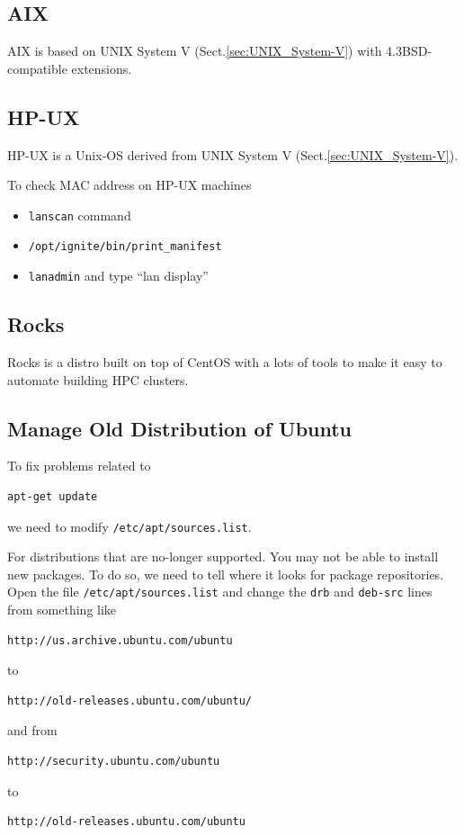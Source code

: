 \subsection{AIX}
\label{sec:AIX}

AIX is based on UNIX System V (Sect.\ref{sec:UNIX_System-V}) with
4.3BSD-compatible extensions.



\subsection{HP-UX}
\label{sec:HP-UX}

HP-UX is a Unix-OS derived from UNIX System V (Sect.\ref{sec:UNIX_System-V}).

To check MAC address on HP-UX machines
\begin{itemize}
  \item \verb!lanscan! command
  \item \verb!/opt/ignite/bin/print_manifest!
  \item \verb!lanadmin! and type ``lan display''
\end{itemize}


\subsection{Rocks}

Rocks is a distro built on top of CentOS with a lots of tools to make it easy to
automate building HPC clusters. 

\subsection{Manage Old Distribution of Ubuntu}

To fix problems related to 
\begin{verbatim}
apt-get update	
\end{verbatim}
we need to modify \verb!/etc/apt/sources.list!.

For distributions that are no-longer supported. You may not be able to install
new packages. To do so, we need to tell where it looks for  package
repositories. Open the file \verb!/etc/apt/sources.list! and change the
\verb!drb! and \verb!deb-src! lines from something like
\begin{verbatim}
http://us.archive.ubuntu.com/ubuntu
\end{verbatim}
to
\begin{verbatim}
http://old-releases.ubuntu.com/ubuntu/
\end{verbatim}
and from
\begin{verbatim}
http://security.ubuntu.com/ubuntu
\end{verbatim}
to 
\begin{verbatim}
http://old-releases.ubuntu.com/ubuntu
\end{verbatim}

